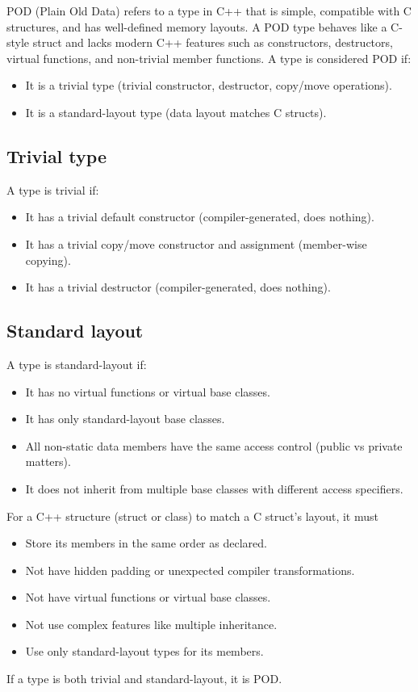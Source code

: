 \documentclass{report}
\begin{document}
    \pagebreak 
    \bigbreak \noindent 
    POD (Plain Old Data) refers to a type in C++ that is simple, compatible with C structures, and has well-defined memory layouts. A POD type behaves like a C-style struct and lacks modern C++ features such as constructors, destructors, virtual functions, and non-trivial member functions.
    \bigbreak \noindent 
    A type is considered POD if:
    \begin{itemize}
        \item It is a trivial type (trivial constructor, destructor, copy/move operations).
        \item It is a standard-layout type (data layout matches C structs).
    \end{itemize}
    \bigbreak \noindent 
    \subsection{Trivial type}
    \bigbreak \noindent 
    A type is trivial if:
    \begin{itemize}
        \item It has a trivial default constructor (compiler-generated, does nothing).
        \item It has a trivial copy/move constructor and assignment (member-wise copying).
        \item It has a trivial destructor (compiler-generated, does nothing).
    \end{itemize}
    \bigbreak \noindent 
    \subsection{Standard layout}
    \bigbreak \noindent 
    A type is standard-layout if:
    \begin{itemize}
        \item It has no virtual functions or virtual base classes.
        \item It has only standard-layout base classes.
        \item All non-static data members have the same access control (public vs private matters).
        \item It does not inherit from multiple base classes with different access specifiers.
    \end{itemize}
    \bigbreak \noindent 
    For a C++ structure (struct or class) to match a C struct's layout, it must
    \begin{itemize}
        \item Store its members in the same order as declared.
        \item Not have hidden padding or unexpected compiler transformations.
        \item Not have virtual functions or virtual base classes.
        \item Not use complex features like multiple inheritance.
        \item Use only standard-layout types for its members.
    \end{itemize}
    \bigbreak \noindent 
    If a type is both trivial and standard-layout, it is POD.
\end{document}

